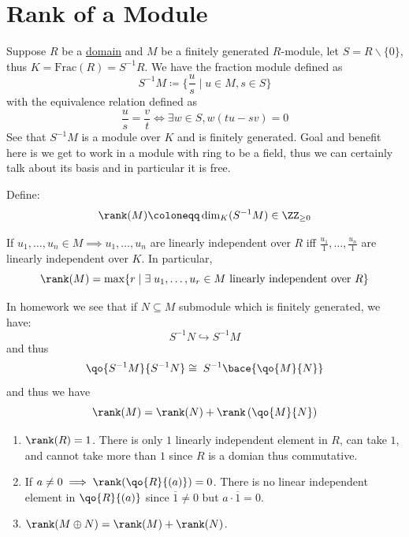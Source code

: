 \section{Rank of a Module}

Suppose \( R \) be a \underline{domain} and \( M \) be a finitely generated \( R \)-module, let \( S
= R \backslash \{0\}\), thus \( K = \text{Frac}(R) = S^{-1} R \). We have the fraction module
defined as
\[
	S^{-1} M \coloneqq \{\frac{u}{s} \; | \; u \in M, s \in S\}
\]
with the equivalence relation defined as
\[
	\frac{u}{s} = \frac{v}{t} \iff \exists w \in S, w(tu - sv) = 0
\]
See that \( S^{-1} M \) is a module over \( K \) and is finitely generated. Goal and benefit here is
we get to work in a module with ring to be a field, thus we can certainly talk about its basis and
in particular it is free.

\begin{definition}
	Define:
	\[
		\rank(M) \coloneqq \dim_K(S^{-1} M) \in \ZZ_{\geq 0}
	\]
\end{definition}

\begin{exercise}
	If \( u_1,\ldots,u_n \in M \implies u_1,\ldots, u_n \) are linearly independent over \( R \) iff
	\( \frac{u_1}{1},\ldots, \frac{u_n}{1} \) are linearly independent over \( K \). In particular,
	\[
		\rank(M) = \max\{r\; | \; \exists \; u_1,\ldots, u_r \in M \text{ linearly independent over }R\}
	\]
\end{exercise}

\begin{exercise}
	In homework we see that if \( N\subseteq M \) submodule which is finitely generated, we have:
	\[
		S^{-1} N \hookrightarrow S^{-1} M
	\]
	and thus
	\[
		\qo{S^{-1}M}{S^{-1}N} \cong \; S^{-1}\bace{\qo{M}{N}}
	\]
	and thus we have
	\[
		\rank(M) = \rank(N) + \rank\left(\qo{M}{N}\right)
	\]
\end{exercise}

\begin{eg}
	\leavevmode
	\begin{enumerate}
		\item \( \rank(R) = 1 \). There is only \( 1 \) linearly independent element in \( R \), can
		      take \( 1 \), and cannot take more than \( 1 \) since \( R \) is a domian thus commutative.
		\item If \( a \ne 0 \implies \rank(\qo{R}{(a)}) = 0 \). There is no linear independent element
		      in \( \qo{R}{(a)} \) since \( \overline{1} \ne 0 \) but \( a\cdot \overline{1} = 0 \).
		\item \( \rank(M \oplus N) = \rank(M) + \rank(N) \).
	\end{enumerate}
\end{eg}


